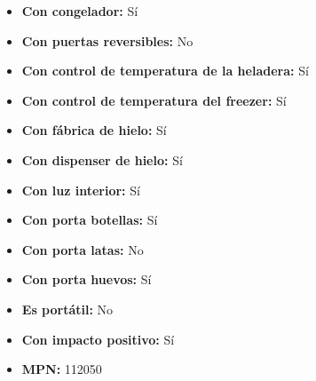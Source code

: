 \documentclass{article}
\begin{document}
\begin{adjustwidth}{2em}{}
\begin{itemize}
\begin{itemize}
    \item \textbf {Con congelador:} Sí
    \item \textbf {Con puertas reversibles:} No
    \item \textbf {Con control de temperatura de la heladera:} Sí
    \item \textbf {Con control de temperatura del freezer:} Sí
    \item \textbf {Con fábrica de hielo:} Sí
    \item \textbf {Con dispenser de hielo:} Sí
    \item \textbf {Con luz interior:} Sí
    \item \textbf {Con porta botellas:} Sí
    \item \textbf {Con porta latas:} No
    \item \textbf {Con porta huevos:} Sí
    \item \textbf {Es portátil:} No
    \item \textbf {Con impacto positivo:} Sí
    \item \textbf {MPN:} 112050
        \end{itemize}
    \end{itemize}

    \vspace{1\baselineskip} %
    \end{adjustwidth}
\end{document}
